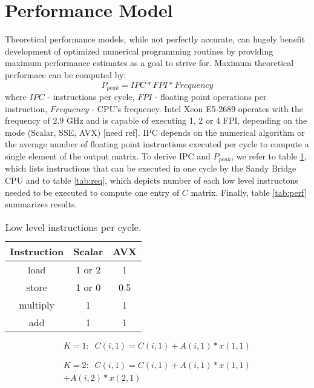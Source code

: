\documentclass[journal, a4paper]{IEEEtran}
\begin{document}
\section{Performance Model}
    Theoretical performance models, while not perfectly accurate, can hugely benefit development of optimized numerical programming routines by providing maximum performance estimates as a goal to strive for. Maximum theoretical performace can be computed by: 
    \begin{equation}
     P_{peak} = IPC * FPI * Frequency
    \end{equation}
    where $IPC$ - instructions per cycle, $FPI$ - floating point operations per instruction, $Frequency$ - CPU's frequency. Intel Xeon E5-2689 operates with the frequency of $2.9$ GHz and is capable of executing 1, 2 or 4 FPI, depending on the mode (Scalar, SSE, AVX) [need ref]. IPC depends on the numerical algorithm or the average number of floating point instructions executed per cycle to compute a single element of the output matrix. To derive IPC and $P_{peak}$, we refer to table \ref{tab:low_level}, which lists instructions that can be executed in one cycle by the Sandy Bridge CPU and to table \ref{tab:req}, which depicts number of each low level instructons needed to be executed to compute one entry of $C$ matrix. Finally, table \ref{tab:perf} summarizes results.
    
      \begin{table}[!hbt]
	\begin{center}
	  \caption{Low level instructions per cycle.}
	  \label{tab:low_level}
	  \begin{tabular}{c|c|c}
		  Instruction	& Scalar & AVX \\
		  \hline
		  load		& 1 or 2 & 1 \\
		  \hline
		  store		& 1 or 0 & 0.5 \\
		  \hline
		  multiply	& 1 & 1 \\
		  \hline
		  add 		& 1 & 1 \\
	  \end{tabular}
	\end{center}
      \end{table}
      
      \begin{equation}      
	  K=1:\;\;C(i, 1) = C(i, 1) + A(i, 1) * x(1, 1) 
      \end{equation} 
      
      \begin{equation}      
	\begin{split}
	  K=2:\;\;C(i, 1) = C(i, 1)  + A(i, 1) * x(1, 1) \\+ A(i, 2) * x(2, 1)
	\end{split}
      \end{equation}
      
\end{document}

